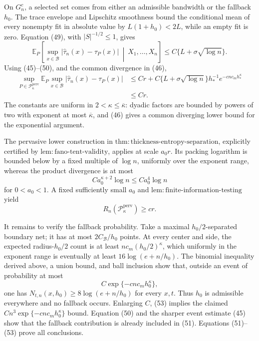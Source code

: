 On \(G_n^c\), a selected set comes from either an admissible bandwidth or
the fallback \(h_0\).  The trace envelope and Lipschitz smoothness bound
the conditional mean of every nonempty fit in absolute value by
\(L(1+h_0)<2L\), while an empty fit is zero.  Equation (49), with
\(|S|^{-1/2}\le1\), gives
\[
 \mathbb E_P\left[\sup_{x\in\mathcal B}
 |\widehat\tau_n(x)-\tau_P(x)|\ \middle|\ X_1,\ldots,X_n\right]
 \le C\{L+\sigma\sqrt{\log n}\}. \tag{50}
\]
Using (45)--(50), and the common divergence in (46),
\[
 \begin{aligned}
 \sup_{P\in\mathcal P_{\kappa}^{\mathrm{perv}}}
 \mathbb E_P\sup_{x\in\mathcal B}|\widehat\tau_n(x)-\tau_P(x)|
 &\le Cr+C\{L+\sigma\sqrt{\log n}\}h_*^{-1}
 e^{-cnc_mh_*^{\kappa}}\\
 &\le Cr.
 \end{aligned} \tag{51}
\]
The constants are uniform in \(2<\kappa\le\overline\kappa\): dyadic
factors are bounded by powers of two with exponent at most
\(\overline\kappa\), and (46) gives a common diverging lower bound for the
exponential argument.

The pervasive lower construction in
\(\mathrm{thm:thickness\text{-}entropy\text{-}separation}\), explicitly
certified by \(\mathrm{lem:fano\text{-}tent\text{-}validity}\), applies at
scale \(a_0r\).  Its packing logarithm is bounded below by a fixed
multiple of \(\log n\), uniformly over the exponent range, whereas the
product divergence is at most
\[
 Ca_0^{\kappa+2}\log n\le Ca_0^4\log n
\]
for \(0<a_0<1\).  A fixed sufficiently small \(a_0\) and
\(\mathrm{lem:finite\text{-}information\text{-}testing}\) yield
\[
 R_n(\mathcal P_{\kappa}^{\mathrm{perv}})\ge cr. \tag{52}
\]

It remains to verify the fallback probability.  Take a maximal
\(h_0/2\)-separated boundary net; it has at most
\(2C_{\mathcal B}/h_0\) points.  At every center and side, the expected
radius-\(h_0/2\) count is at least \(nc_m(h_0/2)^{\kappa}\), which
uniformly in the exponent range is eventually at least
\(16\log(e+n/h_0)\).  The binomial inequality derived above, a union
bound, and ball inclusion show that, outside an event of probability at
most
\[
 C\exp\{-cnc_mh_0^{\kappa}\}, \tag{53}
\]
one has \(N_{t,n}(x,h_0)\ge8\log(e+n/h_0)\) for every \(x,t\).  Thus
\(h_0\) is admissible everywhere and no fallback occurs.  Enlarging
\(C\), (53) implies the claimed
\(Cn^3\exp\{-cnc_mh_0^{\kappa}\}\) bound.  Equation (50) and the sharper
event estimate (45) show that the fallback contribution is already
included in (51).  Equations (51)--(53) prove all conclusions.

